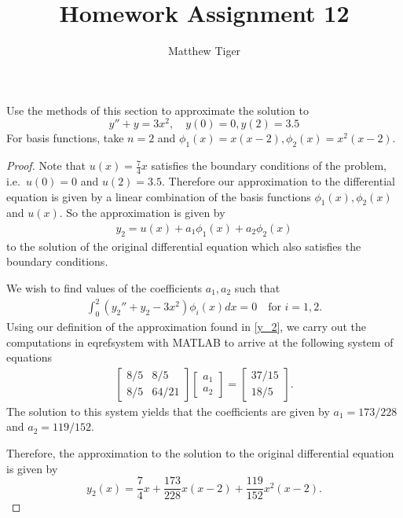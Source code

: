 \documentclass[12pt]{article}
\title{Homework Assignment 12}
\author{Matthew Tiger}
\theoremstyle{definition}
\newenvironment{custompbm}[1]
  {\renewcommand\theproblem{#1}\problem}
  {\endproblem}
\begin{document}
\maketitle


\begin{custompbm}{1}
  Use the methods of this section to approximate the solution to
  \[
    y'' + y = 3x^2, \quad y(0) = 0, y(2) = 3.5
  \]
  For basis functions, take $n=2$ and $\phi_1(x) = x(x-2), \phi_2(x) = x^2(x-2)$.
\end{custompbm}

\begin{proof}
  Note that $u(x) = \frac{7}{4}x$ satisfies the boundary conditions of the problem,
  i.e.\ $u(0) = 0$ and $u(2) = 3.5$. Therefore our approximation to the differential equation is
  given by a linear combination of the basis functions $\phi_1(x), \phi_2(x)$ and $u(x)$.
  So the approximation is given by
  \begin{align}\label{y_2}
    y_2 = u(x) + a_1 \phi_1(x) + a_2 \phi_2(x)
  \end{align}
  to the solution of the original differential equation which also satisfies
  the boundary conditions.

  We wish to find values of the coefficients $a_1, a_2$ such that
  \begin{align}\label{system}
    \int_0^2 \left(y_2'' + y_2 - 3x^2\right)\phi_i(x)dx = 0 \quad \text{for $i = 1,2.$}
  \end{align}
  Using our definition of the approximation found in \eqref{y_2}, we carry out the
  computations in eqref{system} with MATLAB to arrive at the following system
  of equations
  \begin{align*}
    \begin{bmatrix}
      8/5 & 8/5 \\
      8/5 & 64/21
    \end{bmatrix}
    \begin{bmatrix}
      a_1 \\
      a_2
    \end{bmatrix} =
    \begin{bmatrix}
      37/15 \\
      18/5
    \end{bmatrix}.
  \end{align*}
  The solution to this system yields that the coefficients
  are given by $a_1 = 173/228$ and $a_2 = 119/152$.

  Therefore, the approximation to the solution to the original differential equation
  is given by
  \[
    y_2(x) = \frac{7}{4}x + \frac{173}{228}x(x-2) + \frac{119}{152}x^2(x-2).
  \]
\end{proof}
\end{document}
